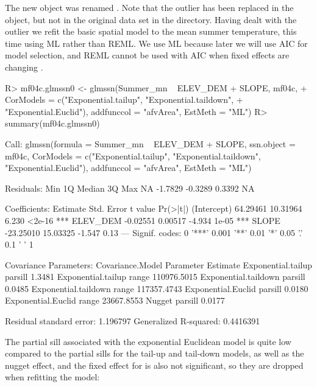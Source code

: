 \documentclass[nojss]{jss}
\renewenvironment{Schunk}{\vspace{\topsep}}{\vspace{\topsep}}
\begin{document}
The new  object was renamed . Note that the outlier has been replaced in the  object, but not in the original data set in the  directory. Having dealt with the outlier we refit the basic spatial model to the mean summer temperature, this time using ML rather than REML. We use ML because later we will use AIC for model selection, and REML cannot be used with AIC when fixed effects are changing \citep[][p. 75]{Verb:Mole:line:2000}.

\begin{Schunk}
\begin{Sinput}
R> mf04c.glmssn0 <- glmssn(Summer_mn ~ ELEV_DEM + SLOPE, mf04c,
+     CorModels = c("Exponential.tailup", "Exponential.taildown",
+     "Exponential.Euclid"), addfunccol = "afvArea", EstMeth = "ML")
R> summary(mf04c.glmssn0)
\end{Sinput}
\begin{Soutput}
Call:
glmssn(formula = Summer_mn ~ ELEV_DEM + SLOPE, ssn.object = mf04c, 
    CorModels = c("Exponential.tailup", "Exponential.taildown", 
        "Exponential.Euclid"), addfunccol = "afvArea", EstMeth = "ML")

Residuals:
    Min      1Q  Median      3Q     Max 
     NA -1.7829 -0.3289  0.3392      NA 

Coefficients:
             Estimate Std. Error t value Pr(>|t|)    
(Intercept)  64.29461   10.31964   6.230   <2e-16 ***
ELEV_DEM     -0.02551    0.00517  -4.934    1e-05 ***
SLOPE       -23.25010   15.03325  -1.547     0.13    
---
Signif. codes:  0 '***' 0.001 '**' 0.01 '*' 0.05 '.' 0.1 ' ' 1

Covariance Parameters:
     Covariance.Model Parameter    Estimate
   Exponential.tailup   parsill      1.3481
   Exponential.tailup     range 110976.5015
 Exponential.taildown   parsill      0.0485
 Exponential.taildown     range 117357.4743
   Exponential.Euclid   parsill      0.0180
   Exponential.Euclid     range  23667.8553
               Nugget   parsill      0.0177

Residual standard error: 1.196797
Generalized R-squared: 0.4416391
\end{Soutput}
\end{Schunk}

The partial sill associated with the exponential Euclidean model is quite low compared to the partial sills for the tail-up and tail-down models, as well as the nugget effect, and the fixed effect for  is also not significant, so they are dropped when refitting the model:
\end{document}
